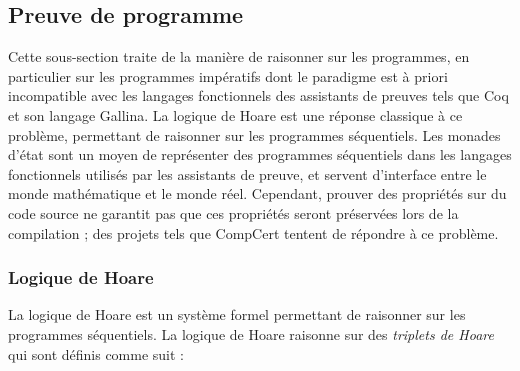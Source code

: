 		\subsection{Preuve de programme}

			Cette sous-section traite de la manière de raisonner sur les programmes, en particulier sur les programmes impératifs dont le paradigme est à priori incompatible avec les langages fonctionnels des assistants de preuves tels que Coq et son langage Gallina. La logique de Hoare est une réponse classique à ce problème, permettant de raisonner sur les programmes séquentiels. Les monades d'état sont un moyen de représenter des programmes séquentiels dans les langages fonctionnels utilisés par les assistants de preuve, et servent d'interface entre le monde mathématique et le monde réel. Cependant, prouver des propriétés sur du code source ne garantit pas que ces propriétés seront préservées lors de la compilation ; des projets tels que CompCert tentent de répondre à ce problème. 

			\subsubsection{Logique de Hoare}

			La logique de Hoare est un système formel permettant de raisonner sur les programmes séquentiels.
			La logique de Hoare raisonne sur des \emph{triplets de Hoare} qui sont définis comme suit :
			
